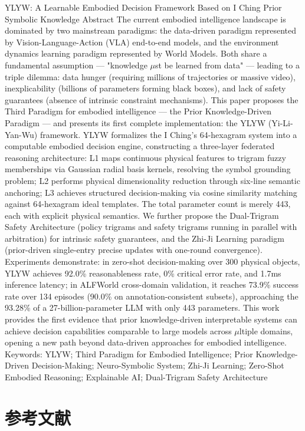 \documentclass[12pt,a4paper]{article}
\begin{document}
YLYW: A Learnable Embodied Decision Framework Based on I Ching Prior Symbolic Knowledge
Abstract
The current embodied intelligence landscape is dominated by two mainstream paradigms: the data-driven paradigm represented by Vision-Language-Action (VLA) end-to-end models, and the environment dynamics learning paradigm represented by World Models. Both share a fundamental assumption — "knowledge $\mu$st be learned from data" — leading to a triple dilemma: data hunger (requiring millions of trajectories or massive video), inexplicability (billions of parameters forming black boxes), and lack of safety guarantees (absence of intrinsic constraint mechanisms). This paper proposes the Third Paradigm for embodied intelligence — the Prior Knowledge-Driven Paradigm — and presents its first complete implementation: the YLYW (Yi-Li-Yan-Wu) framework. YLYW formalizes the I Ching's 64-hexagram system into a computable embodied decision engine, constructing a three-layer federated reasoning architecture: L1 maps continuous physical features to trigram fuzzy memberships via Gaussian radial basis kernels, resolving the symbol grounding problem; L2 performs physical dimensionality reduction through six-line semantic anchoring; L3 achieves structured decision-making via cosine similarity matching against 64-hexagram ideal templates. The total parameter count is merely 443, each with explicit physical semantics. We further propose the Dual-Trigram Safety Architecture (policy trigrams and safety trigrams running in parallel with arbitration) for intrinsic safety guarantees, and the Zhi-Ji Learning paradigm (prior-driven single-entry precise updates with one-round convergence). Experiments demonstrate: in zero-shot decision-making over 300 physical objects, YLYW achieves 92.0\% reasonableness rate, 0\% critical error rate, and 1.7ms inference latency; in ALFWorld cross-domain validation, it reaches 73.9\% success rate over 134 episodes (90.0\% on annotation-consistent subsets), approaching the 93.28\% of a 27-billion-parameter LLM with only 443 parameters. This work provides the first evidence that prior knowledge-driven interpretable systems can achieve decision capabilities comparable to large models across $\mu$ltiple domains, opening a new path beyond data-driven approaches for embodied intelligence.
Keywords: YLYW; Third Paradigm for Embodied Intelligence; Prior Knowledge-Driven Decision-Making; Neuro-Symbolic System; Zhi-Ji Learning; Zero-Shot Embodied Reasoning; Explainable AI; Dual-Trigram Safety Architecture

\section*{参考文献}
\end{document}
